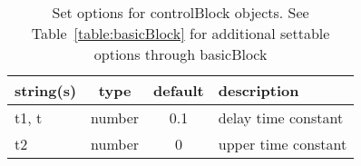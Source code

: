 \begin{table}[ht]
\centering
\begin{tabular}{p{5cm} c c p{7cm}}
\hline
string(s) & type & default & description \\
\hline
t1, t & number & 0.1 & delay time constant\\
t2 & number & 0 & upper time constant\\
\hline
\end{tabular}
\caption{Set options for controlBlock objects. See Table~\ref{table:basicBlock} for additional settable options through basicBlock}
\label{table:controlBlock}
\end{table}

